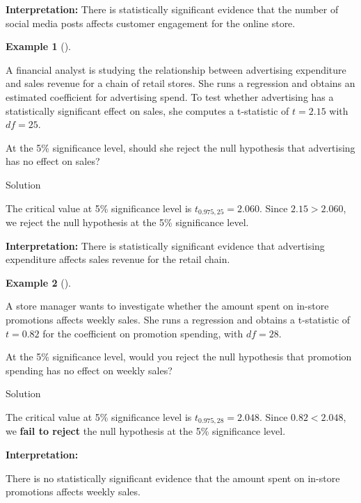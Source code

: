 \documentclass[
  12pt,
  a4paper,
]{scrbook}
\theoremstyle{plain}
\theoremstyle{definition}
\newtheorem{example}{Example}[chapter]
\theoremstyle{remark}
\begin{document}
\textbf{Interpretation:} There is statistically significant evidence
that the number of social media posts affects customer engagement for
the online store.

\begin{example}[]\protect\hypertarget{exm-2}{}\label{exm-2}

A financial analyst is studying the relationship between advertising
expenditure and sales revenue for a chain of retail stores. She runs a
regression and obtains an estimated coefficient for advertising spend.
To test whether advertising has a statistically significant effect on
sales, she computes a t-statistic of \(t = 2.15\) with \(df = 25\).

At the 5\% significance level, should she reject the null hypothesis
that advertising has no effect on sales?

\end{example}

Solution

\protect{}\label{solution2}
The critical value at 5\% significance level is \(t_{0.975,25}=2.060\).
Since \(2.15 > 2.060\), we reject the null hypothesis at the 5\%
significance level.

\textbf{Interpretation:} There is statistically significant evidence
that advertising expenditure affects sales revenue for the retail chain.

\begin{example}[]\protect\hypertarget{exm-3}{}\label{exm-3}

A store manager wants to investigate whether the amount spent on
in-store promotions affects weekly sales. She runs a regression and
obtains a t-statistic of \(t = 0.82\) for the coefficient on promotion
spending, with \(df = 28\).

At the 5\% significance level, would you reject the null hypothesis that
promotion spending has no effect on weekly sales?

\end{example}

Solution

\protect{}\label{solution3}
The critical value at 5\% significance level is \(t_{0.975,28}=2.048\).
Since \(0.82 < 2.048\), we \textbf{fail to reject} the null hypothesis
at the 5\% significance level.

\textbf{Interpretation:}

There is no statistically significant evidence that the amount spent on
in-store promotions affects weekly sales.
\end{document}
